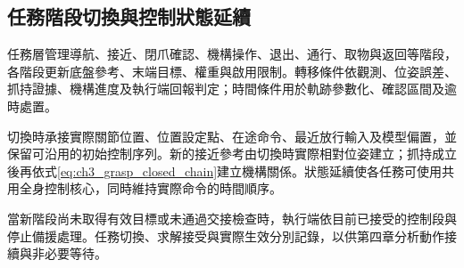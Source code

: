 \subsection{任務階段切換與控制狀態延續}
\label{subsec:task_transition_continuity}

任務層管理導航、接近、閉爪確認、機構操作、退出、通行、取物與返回等階段，各階段更新底盤參考、末端目標、權重與啟用限制。轉移條件依觀測、位姿誤差、抓持證據、機構進度及執行端回報判定；時間條件用於軌跡參數化、確認區間及逾時處置。

切換時承接實際關節位置、位置設定點、在途命令、最近放行輸入及模型偏置，並保留可沿用的初始控制序列。新的接近參考由切換時實際相對位姿建立；抓持成立後再依式\eqref{eq:ch3_grasp_closed_chain}建立機構關係。狀態延續使各任務可使用共用全身控制核心，同時維持實際命令的時間順序。

當新階段尚未取得有效目標或未通過交接檢查時，執行端依目前已接受的控制段與停止備援處理。任務切換、求解接受與實際生效分別記錄，以供第四章分析動作接續與非必要等待。
